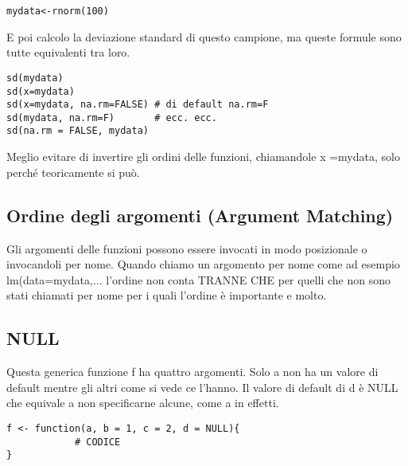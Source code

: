 \begin{lstlisting}
mydata<-rnorm(100)
\end{lstlisting}

E poi calcolo la deviazione standard di questo campione, ma queste formule
sono tutte equivalenti tra loro.

\begin{lstlisting}
sd(mydata)
sd(x=mydata)
sd(x=mydata, na.rm=FALSE) # di default na.rm=F 
sd(mydata, na.rm=F) 	  # ecc. ecc.
sd(na.rm = FALSE, mydata)
\end{lstlisting}

Meglio evitare di invertire gli ordini delle funzioni, chiamandole x =mydata, solo
perché teoricamente si può.
\subsection{Ordine degli argomenti (Argument Matching)}

Gli argomenti delle funzioni possono essere invocati in modo posizionale
o invocandoli per nome.
Quando chiamo un argomento per nome come ad esempio lm(data=mydata,...
l'ordine non conta TRANNE CHE per quelli che non sono stati chiamati per nome per i
quali l'ordine è importante e molto.

\subsection{NULL}
Questa generica funzione f ha quattro argomenti. Solo a non ha un valore
di default mentre gli altri come si vede ce l'hanno. Il valore di default di d è NULL che equivale a non specificarne alcune, come a in effetti.
\begin{lstlisting}
f <- function(a, b = 1, c = 2, d = NULL){
			# CODICE
}
\end{lstlisting}


